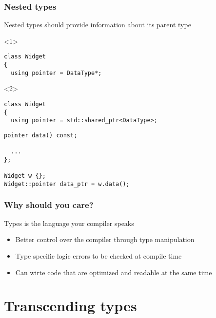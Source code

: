 \documentclass[14pt,a4paper,dvipsnames,usenames]{beamer}
\begin{document}
\begin{frame}[fragile]
  \frametitle{Nested types}

  Nested types should provide information about its parent type

  \vspace{.3cm}
  \begin{onlyenv}<1>
  \begin{lstlisting}[deletekeywords={Widget},morekeywords={DataType}]
class Widget
{
  using pointer = DataType*;
  \end{lstlisting}
  \end{onlyenv}
  \begin{onlyenv}<2>
  \begin{lstlisting}[deletekeywords={Widget},morekeywords={DataType}]
class Widget
{
  using pointer = std::shared_ptr<DataType>;
  \end{lstlisting}
  \end{onlyenv}
  \begin{lstlisting}[morekeywords={pointer}]
  pointer data() const;

  ...
};

Widget w {};
Widget::pointer data_ptr = w.data();
  \end{lstlisting}
  
\end{frame}

\begin{frame}[fragile]
  \frametitle{Why should you care?}

  Types is the language your compiler speaks

  \vspace{.5cm}
  \begin{itemize}
    \setlength\itemsep{.25cm}
    \item Better control over the compiler through type manipulation
    \item Type specific logic errors to be checked at compile time
    \item Can wirte code that are optimized and readable at the same time
  \end{itemize}
  
\end{frame}

\section{Transcending types}

\frame[plain]{\sectionpage}
\end{document}
